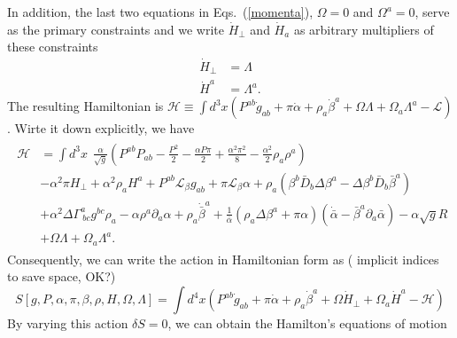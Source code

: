 \documentclass[letterpaper,nofootinbib,prd,amsmath,onecolumn]{revtex4-1}
\begin{document}
In addition, the last two equations in Eqs.~(\ref{momenta}), $\Omega = 0$ and $\Omega^{a} = 0$, serve as the primary constraints and we write ${\dot H}_{\perp}$ and ${\dot H}_{a}$ as arbitrary multipliers of these constraints
\begin{subequations}
\begin{align}
{\dot H}_{\perp} & = \Lambda\\
{\dot H}^{a} & = \Lambda^{a}.
\end{align}
\end{subequations}
The resulting Hamiltonian is $\mathscr{H} \equiv \int d^{3}x \left( P^{ab}{\dot g}_{ab} + \pi {\dot \alpha} + \rho_{a}{\dot \beta}^{a} + \Omega \Lambda + \Omega_{a}\Lambda^{a} - \mathscr{L} \right)$. Wirte it down explicitly, we have
\begin{align}
\begin{split}
\mathscr{H} &= \int d^{3}x~~ \frac{\alpha}{\sqrt{g}}\left(P^{ab}P_{ab} - \frac{P^{2}}{2} - \frac{\alpha P \pi}{2} + \frac{\alpha^{2}\pi^{2}}{8} - \frac{\alpha^{2}}{2}\rho_{a}\rho^{a}\right)\\
& -\alpha^{2}\pi H_{\perp} + \alpha^{2}\rho_{a}H^{a} + P^{ab} \mathcal{L}_{\beta}g_{ab} + \pi \mathcal{L}_{\beta}\alpha + \rho_{a}\left(\beta^{b}{\bar D}_{b}\Delta \beta^{a} - \Delta \beta^{b} {\bar D}_{b}{\bar \beta}^{a}\right)\\
& + \alpha^{2}\Delta\Gamma^{a}_{~bc}g^{bc}\rho_{a} - \alpha \rho^{a}\partial_{a}\alpha + \rho_{a}{\dot {\bar \beta}}^{a} + \frac{1}{{\bar \alpha}}\left(\rho_{a}\Delta \beta^{a} + \pi \alpha \right)\left({\dot {\bar \alpha}} - {\bar \beta}^{a}\partial_{a}{\bar \alpha}\right) - \alpha\sqrt{g}R\\
& + \Omega \Lambda + \Omega_{a}\Lambda^{a}.
\end{split}
\end{align}
Consequently, we can write the action in Hamiltonian form as ({\color{red} implicit indices to save space, OK?})
\begin{equation}
S[g, P, \alpha, \pi, \beta, \rho, H, \Omega, \Lambda ] = \int d^{4}x \left(P^{ab}{\dot g}_{ab} + \pi {\dot \alpha} + \rho_{a}{\dot \beta}^{a} + \Omega{\dot H_{\perp}} + \Omega_{a}{\dot H}^{a} - \mathscr{H}\right)
\end{equation}
By varying this action $\delta S = 0$, we can obtain the Hamilton's equations of motion
\end{document}
